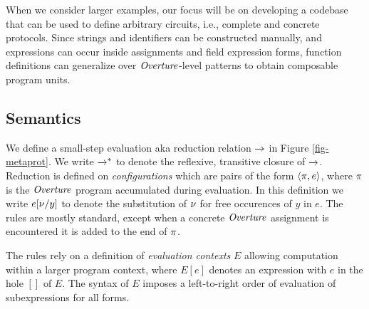 When we consider larger examples, our
focus will be on developing a codebase that can be used to define
arbitrary circuits, i.e., complete and concrete protocols. Since
strings and identifiers can be constructed manually, and expressions
can occur inside assignments and field expression forms, function
definitions can generalize over $\mathit{Overture}$-level patterns to obtain
composable program units.

\metaprotfig

\subsection{Semantics}

We define a small-step evaluation aka reduction relation $\xrightarrow{}$ in
Figure \ref{fig-metaprot}.  We write $\xrightarrow{}^{*}$ to denote the
reflexive, transitive closure of $\xrightarrow{}$. Reduction is defined on
\emph{configurations} which are pairs of the form $\langle \pi,e \rangle$,
where $\pi$ is the $\mathit{Overture}$ program accumulated during evaluation.
In this definition we write $e[\nu/y]$ to denote the substitution of $\nu$
for free occurences of $y$ in $e$. The rules are mostly standard,
except when a concrete $\mathit{Overture}$ assignment is encountered it is added
to the end of $\pi$.

The rules rely on a definition of \emph{evaluation contexts} $E$
allowing computation within a larger program context, where $E[e]$
denotes an expression with $e$ in the hole $[]$ of $E$. The syntax
of $E$ imposes a left-to-right order of evaluation of subexpressions
for all forms.
